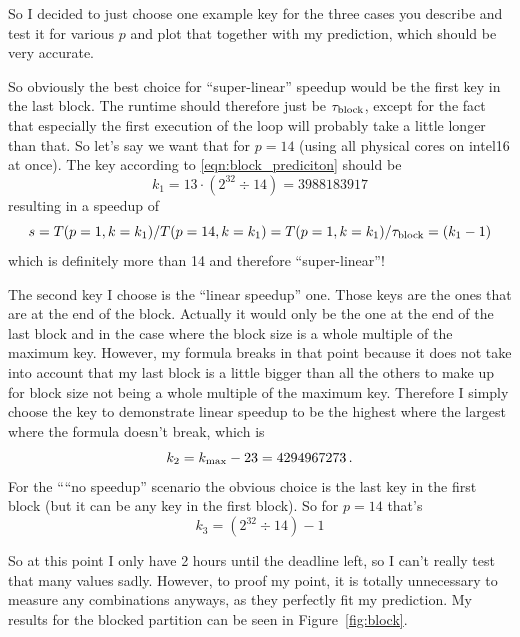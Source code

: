 \documentclass[a4paper, 11pt]{article}
\begin{document}
So I decided to just choose one example key for the three cases you describe
and test it for various $p$ and plot that together with my prediction, which
should be very accurate. 

So obviously the best choice for ``super-linear'' speedup would be the first
key in the last block. The runtime should therefore just be
$\tau_\textup{block}$, except for the fact that especially the first execution
of the loop will probably take a little longer than that. So let's say we want
that for $p=14$ (using all physical cores on intel16 at once). The key
according to \eqref{eqn:block_prediciton} should be
\begin{equation}
  k_1 = 13\cdot (2^{32} \div 14) = 3988183917
  \label{eqn:k_1}
\end{equation}
resulting in a speedup of
\begin{equation}
  s = T(p = 1, k = k_1)/T(p = 14, k = k_1) = T(p = 1, k = k_1)/\tau_\textup{block} = (k_1 - 1)
\end{equation}
which is definitely more than 14 and therefore ``super-linear''!

The second key I choose is the ``linear speedup'' one. Those keys are the ones
that are at the end of the block. Actually it would only be the one at the end
of the last block and in the case where the block size is a whole multiple of
the maximum key. However, my formula breaks in that point because it does not
take into account that my last block is a little bigger than all the others to
make up for block size not being a whole multiple of the maximum key. Therefore
I simply choose the key to demonstrate linear speedup to be the highest where
the largest where the formula doesn't break, which is  
\begin{equation}
  k_2 = k_\textup{max} - 23 = 4294967273\,.
\end{equation}
For the ````no speedup'' scenario the obvious choice is the last key in the
first block (but it can be any key in the first block). So for $p = 14$ that's
\begin{equation}
  k_3 = (2^{32} \div 14) - 1
\end{equation}

So at this point I only have 2 hours until the deadline left, so I can't really
test that many values sadly. However, to proof my point, it is totally
unnecessary to measure any combinations anyways, as they perfectly fit my
prediction. My results for the blocked partition can be seen in
Figure~\ref{fig:block}.
\end{document}
